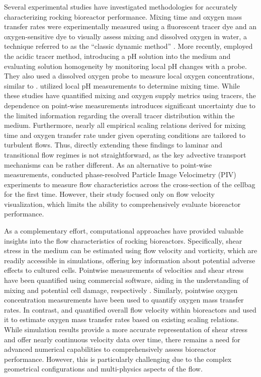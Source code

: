\documentclass[final,3p,times,twocolumn,authoryear]{elsarticle}
\theoremstyle{definition}
\begin{document}
Several experimental studies have investigated methodologies for accurately characterizing rocking bioreactor performance. Mixing time and oxygen mass transfer rates were experimentally measured using a fluorescent tracer dye and an oxygen-sensitive dye to visually assess mixing and dissolved oxygen in water, a technique referred to as the ``classic dynamic method'' \citep{Singh1999}. More recently, \citet{Bai2019a} employed the acidic tracer method, introducing a pH solution into the medium and evaluating solution homogeneity by monitoring local pH changes with a probe. They also used a dissolved oxygen probe to measure local oxygen concentrations, similar to \citet{Singh1999}. \citet{Bartczak2022} utilized local pH measurements to determine mixing time. While these studies have quantified mixing and oxygen supply metrics using tracers, the dependence on point-wise measurements introduces significant uncertainty due to the limited information regarding the overall tracer distribution within the medium. Furthermore, nearly all empirical scaling relations derived for mixing time and oxygen transfer rate under given operating conditions are tailored to turbulent flows. Thus, directly extending these findings to laminar and transitional flow regimes is not straightforward, as the key advective transport mechanisms can be rather different. As an alternative to point-wise measurements, \citet{Marsh2017} conducted phase-resolved Particle Image Velocimetry (PIV) experiments to measure flow characteristics across the cross-section of the cellbag for the first time. However, their study focused only on flow velocity visualization, which limits the ability to comprehensively evaluate bioreactor performance.

As a complementary effort, computational approaches have provided valuable insights into the flow characteristics of rocking bioreactors. Specifically, shear stress in the medium can be estimated using flow velocity and vorticity, which are readily accessible in simulations, offering key information about potential adverse effects to cultured cells. Pointwise measurements of velocities and shear stress have been quantified using commercial software, aiding in the understanding of mixing and potential cell damage, respectively \citep{Oncul2010,Zhan2019}. Similarly, pointwise oxygen concentration measurements have been used to quantify oxygen mass transfer rates. In contrast, \citet{Svay2020} and \citet{Seidel2022} quantified overall flow velocity within bioreactors and used it to estimate oxygen mass transfer rates based on existing scaling relations. While simulation results provide a more accurate representation of shear stress and offer nearly continuous velocity data over time, there remains a need for advanced numerical capabilities to comprehensively assess bioreactor performance. However, this is particularly challenging due to the complex geometrical configurations and multi-physics aspects of the flow.
\end{document}
